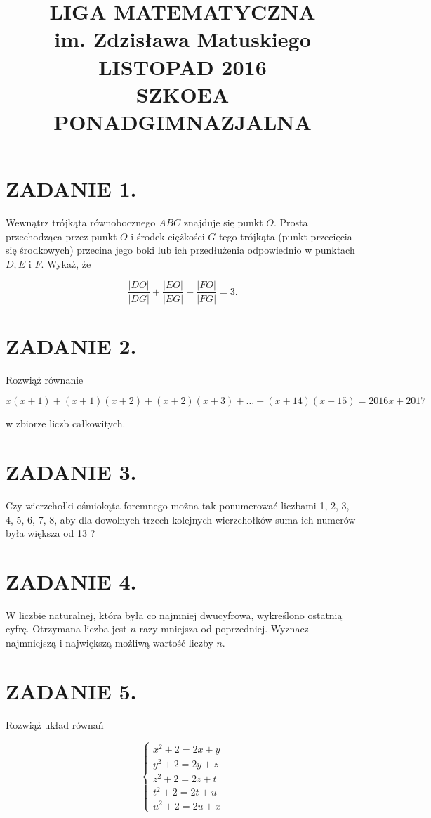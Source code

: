 \documentclass[10pt]{article}
\title{LIGA MATEMATYCZNA \\
 im. Zdzisława Matuskiego \\
 LISTOPAD 2016 \\
 SZKOEA PONADGIMNAZJALNA }
\author{}
\date{}
\begin{document}
\maketitle
\section*{ZADANIE 1.}
Wewnątrz trójkąta równobocznego \(A B C\) znajduje się punkt \(O\). Prosta przechodząca przez punkt \(O\) i środek ciężkości \(G\) tego trójkąta (punkt przecięcia się środkowych) przecina jego boki lub ich przedłużenia odpowiednio w punktach \(D, E\) i \(F\). Wykaż, że

\[
\frac{|D O|}{|D G|}+\frac{|E O|}{|E G|}+\frac{|F O|}{|F G|}=3 .
\]

\section*{ZADANIE 2.}
Rozwiąż równanie

\[
x(x+1)+(x+1)(x+2)+(x+2)(x+3)+\ldots+(x+14)(x+15)=2016 x+2017
\]

w zbiorze liczb całkowitych.

\section*{ZADANIE 3.}
Czy wierzchołki ośmiokąta foremnego można tak ponumerować liczbami 1, 2, 3, 4, 5, 6, 7, 8, aby dla dowolnych trzech kolejnych wierzchołków suma ich numerów była większa od 13 ?

\section*{ZADANIE 4.}
W liczbie naturalnej, która była co najmniej dwucyfrowa, wykreślono ostatnią cyfrę. Otrzymana liczba jest \(n\) razy mniejsza od poprzedniej. Wyznacz najmniejszą i największą możliwą wartość liczby \(n\).

\section*{ZADANIE 5.}
Rozwiąż układ równań

\[
\left\{\begin{array}{l}
x^{2}+2=2 x+y \\
y^{2}+2=2 y+z \\
z^{2}+2=2 z+t \\
t^{2}+2=2 t+u \\
u^{2}+2=2 u+x
\end{array}\right.
\]
\end{document}
